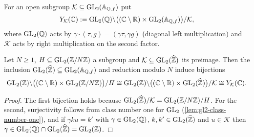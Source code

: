 \begin{definition}\label{def:adelic-double-coset}
For an open subgroup $\mathcal{K} \subseteq \GL{2}{\FiniteAdeles{\QQ}}$ put
\[
  \OpenModCurve{\mathcal{K}}(\CC) := \GL{2}{\QQ}\backslash\bigl((\SlitPlane)\times
  \GL{2}{\FiniteAdeles{\QQ}}\bigr)/\mathcal{K},
\]
where $\GL{2}{\QQ}$ acts by $\gamma\cdot(\tau, g) = (\gamma\tau, \gamma g)$
(diagonal left multiplication) and $\mathcal{K}$ acts by right
multiplication on the second factor.
\end{definition}

\begin{proposition}\label{prop:finite-vs-adelic}
Let $N \geq 1$, $H \subseteq \GL{2}{\ResidueRing{N}}$ a subgroup and
$\mathcal{K} \subseteq \GL{2}{\ProfiniteIntegers}$ its preimage. Then the
inclusion $\GL{2}{\ProfiniteIntegers} \subseteq \GL{2}{\FiniteAdeles{\QQ}}$
and reduction modulo $N$ induce bijections
\[
  \GL{2}{\ZZ}\backslash\bigl((\SlitPlane)\times\GL{2}{\ResidueRing{N}}\bigr)/H
  \cong
  \GL{2}{\ZZ}\backslash\bigl((\SlitPlane)\times\GL{2}{\ProfiniteIntegers}\bigr)/\mathcal{K}
  \cong \OpenModCurve{\mathcal{K}}(\CC).
\]
\end{proposition}

\begin{proof}
The first bijection holds because
$\GL{2}{\ProfiniteIntegers}/\mathcal{K} = \GL{2}{\ResidueRing{N}}/H$. For the
second, surjectivity follows from class number one for $\GL{2}{}$
(\cref{lem:gl2-class-number-one}), and if
$\gamma k u = k'$ with $\gamma \in \GL{2}{\QQ}$, $k, k' \in \GL{2}{\ProfiniteIntegers}$
and $u \in \mathcal{K}$ then
$\gamma \in \GL{2}{\QQ}\cap\GL{2}{\ProfiniteIntegers} = \GL{2}{\ZZ}$.
\end{proof}

